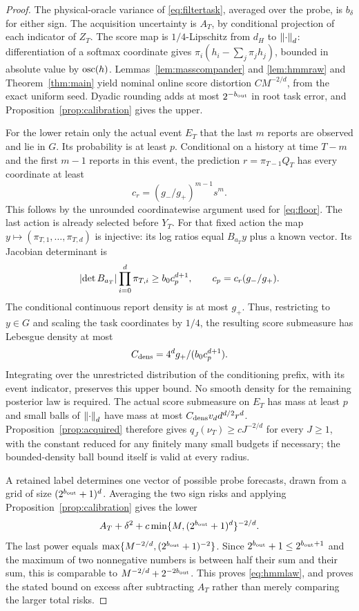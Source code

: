 \begin{proof}
The physical-oracle variance of \eqref{eq:filtertask}, averaged over the probe, is $b_\delta$ for either sign. The acquisition uncertainty is $A_T$, by conditional projection of each indicator of $Z_T$. The score map is $1/4$-Lipschitz from $d_H$ to $\left\lVert\cdot\right\rVert_d$: differentiation of a softmax coordinate gives $\pi_i(h_i-\sum_j\pi_jh_j)$, bounded in absolute value by $\operatorname{osc}(h)$. Lemmas~\ref{lem:masscompander} and \ref{lem:hmmraw} and Theorem~\ref{thm:main} yield nominal online score distortion $CM^{-2/d}$, from the exact uniform seed. Dyadic rounding adds at most $2^{-b_{\rm out}}$ in root task error, and Proposition~\ref{prop:calibration} gives the upper.

For the lower retain only the actual event $E_T$ that the last $m$ reports are observed and lie in $G$. Its probability is at least $p$. Conditional on a history at time $T-m$ and the first $m-1$ reports in this event, the prediction $r=\pi_{T-1}Q_T$ has every coordinate at least
\[
 c_r=(g_-/g_+)^{m-1}s^m.
\]
This follows by the unrounded coordinatewise argument used for \eqref{eq:floor}. The last action is already selected before $Y_T$. For that fixed action the map $y\mapsto(\pi_{T,1},\ldots,\pi_{T,d})$ is injective: its log ratios equal $B_{a_T}y$ plus a known vector. Its Jacobian determinant is
\begin{equation}\label{eq:gaussjac}
 \left\lvert\det B_{a_T}\right\rvert\prod_{i=0}^d\pi_{T,i}
 \ge b_0 c_p^{d+1},\qquad c_p=c_r(g_-/g_+).
\end{equation}
The conditional continuous report density is at most $g_+$. Thus, restricting to $y\in G$ and scaling the task coordinates by $1/4$, the resulting score submeasure has Lebesgue density at most
\begin{equation}\label{eq:actualdensity}
 C_{\rm dens}=4^d g_+/(b_0c_p^{d+1}).
\end{equation}
Integrating over the unrestricted distribution of the conditioning prefix, with its event indicator, preserves this upper bound. No smooth density for the remaining posterior law is required. The actual score submeasure on $E_T$ has mass at least $p$ and small balls of $\left\lVert\cdot\right\rVert_d$ have mass at most $C_{\rm dens}v_dd^{d/2}r^d$. Proposition~\ref{prop:acquired} therefore gives $q_J(\nu_T)\ge cJ^{-2/d}$ for every $J\ge1$, with the constant reduced for any finitely many small budgets if necessary; the bounded-density ball bound itself is valid at every radius.

A retained label determines one vector of possible probe forecasts, drawn from a grid of size $(2^{b_{\rm out}}+1)^d$. Averaging the two sign risks and applying Proposition~\ref{prop:calibration} gives the lower
\[
 A_T+\delta^2+c\min\{M,(2^{b_{\rm out}}+1)^d\}^{-2/d}.
\]
The last power equals
$\max\{M^{-2/d},(2^{b_{\rm out}}+1)^{-2}\}$.
Since $2^{b_{\rm out}}+1\le2^{b_{\rm out}+1}$ and the maximum of two nonnegative numbers is between half their sum and their sum, this is comparable to $M^{-2/d}+2^{-2b_{\rm out}}$. This proves \eqref{eq:hmmlaw}, and proves the stated bound on excess after subtracting $A_T$ rather than merely comparing the larger total risks.
\end{proof}

